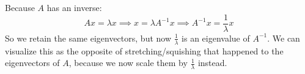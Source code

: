 \documentclass{article}
\newcommand\ifrac[2]{{\displaystyle\frac{#1}{#2}}}
\begin{document}
\vspace{1.8cm}
\\\\


Because $A$ has an inverse:
$$
    Ax = \lambda x \implies x = \lambda A^{-1}x \implies A^{-1}x = \ifrac{1}{\lambda}x
$$
So we retain the same eigenvectors, but now $\frac{1}{\lambda}$ is an eigenvalue of $A^{-1}$.
We can visualize this as the opposite of stretching/squishing
that happened to the eigenvectors of $A$, because we now scale them by $\frac{1}{\lambda}$ instead.
\end{document}
